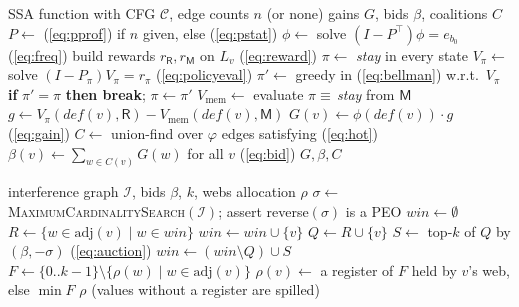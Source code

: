 \documentclass[conference]{IEEEtran}
\newcommand{\Reg}{\mathsf{R}}
\newcommand{\Mem}{\mathsf{M}}
\begin{document}
\begin{algorithm}[t]
\caption{Profile-driven gains and coalition bids}
\label{alg:gains}
\begin{algorithmic}[1]
\REQUIRE SSA function with CFG $\mathcal{C}$, edge counts $n$ (or none)
\ENSURE gains $G$, bids $\beta$, coalitions $C$
\STATE $P \leftarrow$ (\ref{eq:pprof}) if $n$ given, else (\ref{eq:pstat})
\STATE $\phi \leftarrow$ solve $(I-P^\top)\phi=e_{b_0}$ \hfill (\ref{eq:freq})
  \STATE build rewards $r_\Reg, r_\Mem$ on $L_v$ \hfill (\ref{eq:reward})
  \STATE $\pi \leftarrow$ \emph{stay} in every state
  \REPEAT
    \STATE $V_\pi \leftarrow$ solve $(I-P_\pi)V_\pi=r_\pi$ \hfill (\ref{eq:policyeval})
    \STATE $\pi' \leftarrow$ greedy in (\ref{eq:bellman}) w.r.t.\ $V_\pi$
    \STATE \textbf{if} $\pi'=\pi$ \textbf{then break}; $\pi\leftarrow\pi'$
  \STATE $V_{\mathrm{mem}} \leftarrow$ evaluate $\pi\equiv$\,\emph{stay} from $\Mem$
  \STATE $g\leftarrow V_\pi(\mathit{def}(v),\Reg)-V_{\mathrm{mem}}(\mathit{def}(v),\Mem)$
  \STATE $G(v)\leftarrow \phi(\mathit{def}(v))\cdot g$ \hfill (\ref{eq:gain})
\ENDFOR
\STATE $C \leftarrow$ union-find over $\varphi$ edges satisfying (\ref{eq:hot})
\STATE $\beta(v)\leftarrow\sum_{w\in C(v)}G(w)$ for all $v$ \hfill (\ref{eq:bid})
\RETURN $G,\beta,C$
\end{algorithmic}
\end{algorithm}

\begin{algorithm}[t]
\caption{MCS-ordered sealed-bid auction and register binding}
\label{alg:auction}
\begin{algorithmic}[1]
\REQUIRE interference graph $\mathcal{I}$, bids $\beta$, $k$, webs
\ENSURE allocation $\rho$
\STATE $\sigma\leftarrow$ \textsc{MaximumCardinalitySearch}$(\mathcal{I})$; assert reverse$(\sigma)$ is a PEO
\STATE $\mathit{win}\leftarrow\emptyset$
  \STATE $R\leftarrow\{w\in\mathrm{adj}(v)\mid w\in\mathit{win}\}$
    \STATE $\mathit{win}\leftarrow\mathit{win}\cup\{v\}$
  \ELSE
    \STATE $Q\leftarrow R\cup\{v\}$ 
    \STATE $S\leftarrow$ top-$k$ of $Q$ by $(\beta,-\sigma)$ \hfill (\ref{eq:auction})
    \STATE $\mathit{win}\leftarrow(\mathit{win}\setminus Q)\cup S$
  \ENDIF
\ENDFOR
{}
  \STATE $F\leftarrow\{0..k{-}1\}\setminus\{\rho(w)\mid w\in\mathrm{adj}(v)\}$
  \STATE $\rho(v)\leftarrow$ a register of $F$ held by $v$'s web, else $\min F$
\ENDFOR
\RETURN $\rho$ (values without a register are spilled)
\end{algorithmic}
\end{algorithm}
\end{document}
